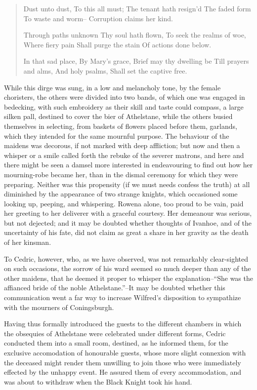 \begin{quote}
Dust unto dust,
To this all must;
The tenant hath resign'd
The faded form
To waste and worm--
Corruption claims her kind.

Through paths unknown
Thy soul hath flown,
To seek the realms of woe,
Where fiery pain
Shall purge the stain
Of actions done below.

In that sad place,
By Mary's grace,
Brief may thy dwelling be
Till prayers and alms,
And holy psalms,
Shall set the captive free.
\end{quote}

While this dirge was sung, in a low and melancholy tone, by the female
choristers, the others were divided into two bands, of which one was
engaged in bedecking, with such embroidery as their skill and taste
could compass, a large silken pall, destined to cover the bier of
Athelstane, while the others busied themselves in selecting, from
baskets of flowers placed before them, garlands, which they intended for
the same mournful purpose. The behaviour of the maidens was decorous, if
not marked with deep affliction; but now and then a whisper or a smile
called forth the rebuke of the severer matrons, and here and there might
be seen a damsel more interested in endeavouring to find out how her
mourning-robe became her, than in the dismal ceremony for which they
were preparing. Neither was this propensity (if we must needs confess
the truth) at all diminished by the appearance of two strange knights,
which occasioned some looking up, peeping, and whispering. Rowena alone,
too proud to be vain, paid her greeting to her deliverer with a graceful
courtesy. Her demeanour was serious, but not dejected; and it may be
doubted whether thoughts of Ivanhoe, and of the uncertainty of his fate,
did not claim as great a share in her gravity as the death of her
kinsman.

To Cedric, however, who, as we have observed, was not remarkably
clear-sighted on such occasions, the sorrow of his ward seemed so much
deeper than any of the other maidens, that he deemed it proper to
whisper the explanation--``She was the affianced bride of the noble
Athelstane.''--It may be doubted whether this communication went a far
way to increase Wilfred's disposition to sympathize with the mourners of
Coningsburgh.

Having thus formally introduced the guests to the different chambers in
which the obsequies of Athelstane were celebrated under different forms,
Cedric conducted them into a small room, destined, as he informed them,
for the exclusive accomodation of honourable guests, whose more slight
connexion with the deceased might render them unwilling to join those
who were immediately effected by the unhappy event. He assured them of
every accommodation, and was about to withdraw when the Black Knight
took his hand.

